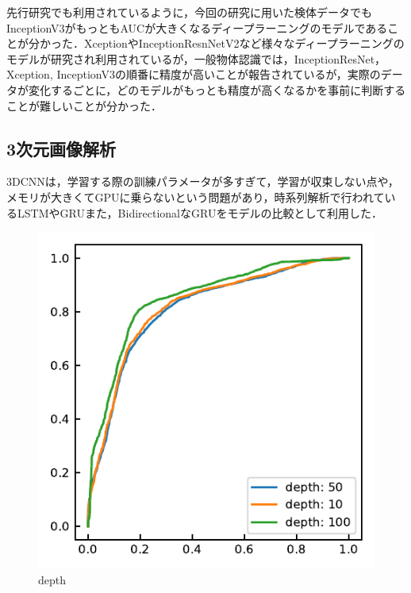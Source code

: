 先行研究でも利用されているように，今回の研究に用いた検体データでもInceptionV3がもっともAUCが大きくなるディープラーニングのモデルであることが分かった．XceptionやInceptionResnNetV2など様々なディープラーニングのモデルが研究され利用されているが，一般物体認識では，InceptionResNet，Xception, InceptionV3の順番に精度が高いことが報告されているが，実際のデータが変化するごとに，どのモデルがもっとも精度が高くなるかを事前に判断することが難しいことが分かった．

\subsection{3次元画像解析}
3DCNNは，学習する際の訓練パラメータが多すぎて，学習が収束しない点や，メモリが大きくてGPUに乗らないという問題があり，時系列解析で行われているLSTMやGRUまた，BidirectionalなGRUをモデルの比較として利用した．

\begin{figure}[H]
	\centering
	\includegraphics[width=0.7\linewidth]{fig/chapter4/3d/roc/depth_all.pdf}
	\caption{depth}
	\label{fig:depthall}
\end{figure}

